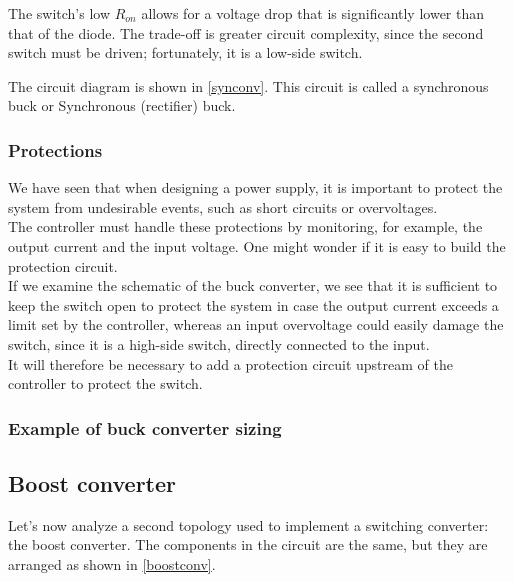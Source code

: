 \documentclass[../main.tex]{subfiles}
\begin{document}
The switch’s low $R_{on}$ allows for a voltage drop that is significantly lower than that of the diode. The trade-off is greater circuit complexity, since the second switch must be driven; fortunately, it is a low-side switch. 

The circuit diagram is shown in \autoref{synconv}. This circuit is called a synchronous buck or Synchronous (rectifier) buck.

\subsubsection*{Protections}

We have seen that when designing a power supply, it is important to protect the
system from undesirable events, such as short circuits or overvoltages.\\

The controller must handle these protections by monitoring, for example, the output current and the input voltage. One might wonder if it is easy to build the protection circuit.\\

If we examine the schematic of the buck converter, we see that it is sufficient to keep the switch open to protect the system in case the output current exceeds a limit set by the controller, whereas an input overvoltage could easily damage the switch, since it is a high-side switch, directly connected to the input.\\

It will therefore be necessary to add a protection circuit upstream of the controller to protect the switch.



\subsubsection{Example of buck converter sizing} %




\subsection{Boost converter}


Let’s now analyze a second topology used to implement a switching converter: the boost converter. The components in the circuit are the same, but they are arranged as shown in \autoref{boostconv}.
\end{document}
